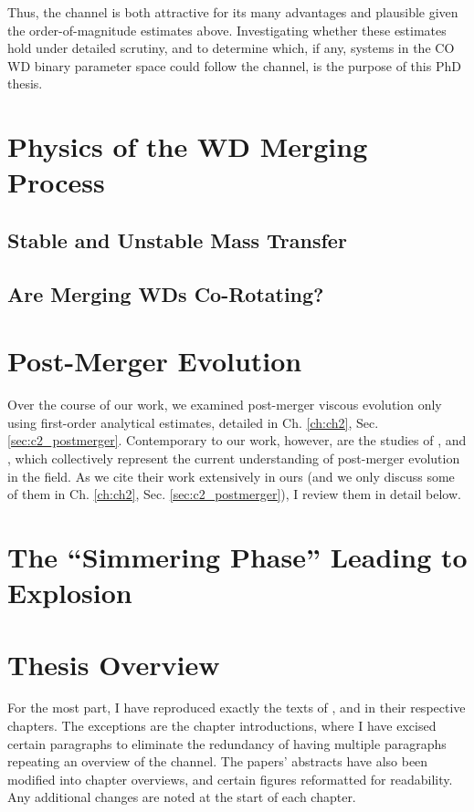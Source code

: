 Thus, the \citeal{vkercj10} channel is both attractive for its many advantages and plausible given the order-of-magnitude estimates above.  Investigating whether these estimates hold under detailed scrutiny, and to determine which, if any, systems in the CO WD binary parameter space could follow the channel, is the purpose of this PhD thesis.

\section{Physics of the WD Merging Process}

\subsection{Stable and Unstable Mass Transfer}

\subsection{Are Merging WDs Co-Rotating?}

\section{Post-Merger Evolution}

Over the course of our work, we examined post-merger viscous evolution only using first-order analytical estimates, detailed in Ch. \ref{ch:ch2}, Sec. \ref{sec:c2_postmerger}.  Contemporary to our work, however, are the studies of \cite{shen+12}, \cite{schw+12} and \cite{ji+13}, which collectively represent the current understanding of post-merger evolution in the field.  As we cite their work extensively in ours (and we only discuss some of them in Ch. \ref{ch:ch2}, Sec. \ref{sec:c2_postmerger}), I review them in detail below.

\section{The ``Simmering Phase'' Leading to Explosion}

\section{Thesis Overview}

For the most part, I have reproduced exactly the texts of \citeal{zhu+13}, \citeal{zhu+15} and \citeal{zhu+16} in their respective chapters.  The exceptions are the chapter introductions, where I have excised certain paragraphs to eliminate the redundancy of having multiple paragraphs repeating an overview of the \citeal{vkercj10} channel.  The papers' abstracts have also been modified into chapter overviews, and certain figures reformatted for readability.  Any additional changes are noted at the start of each chapter.
